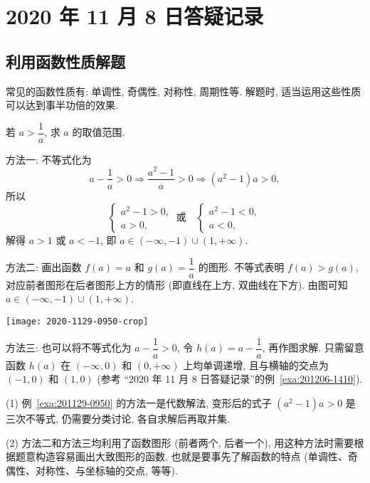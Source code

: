 \section{2020 年 11 月 8 日答疑记录}

\subsection{利用函数性质解题}

常见的函数性质有: 单调性, 奇偶性, 对称性, 周期性等. 解题时, 适当运用这些性质可以达到事半功倍的效果.

\begin{example}\label{exa:201129-0950}
    若 $a>\dfrac1a$, 求 $a$ 的取值范围.
\end{example}
\begin{solution}
    方法一: 不等式化为 
    \[a-\frac1a>0\Rightarrow \frac{a^2-1}a>0\Rightarrow (a^2-1)a>0,\]
    所以
    \[\left\{\!\!\begin{array}{l}
        a^2-1>0,\\
        a>0,
        \end{array}\right.\ \text{或}\quad
      \left\{\!\!\begin{array}{l}
        a^2-1<0,\\
        a<0,
        \end{array}\right.\]
    解得 $a>1$ 或 $a<-1$, 即 $a\in(-\infty,-1)\cup(1,+\infty)$.
    
    方法二: 画出函数 $f(a)=a$ 和 $g(a)=\dfrac1a$ 的图形. 不等式表明 $f(a)>g(a)$, 对应前者图形在后者图形上方的情形 (即直线在上方, 双曲线在下方). 由图可知 $a\in(-\infty,-1)\cup(1,+\infty)$.

    \begin{center}
        \texttt{[image: 2020-1129-0950-crop]}
    \end{center}
    
    方法三: 也可以将不等式化为 $a-\dfrac1a>0$, 令 $h(a)= a-\dfrac1a$, 再作图求解. 只需留意函数 $h(a)$ 在 $(-\infty,0)$ 和 $(0,+\infty)$ 上均单调递增, 且与横轴的交点为 $(-1,0)$ 和 $(1,0)$ (参考 ``2020 年 11 月 8 日答疑记录''的例~\ref{exa:201206-1410}).
\end{solution}

\begin{remark}
    (1) 例~\ref{exa:201129-0950} 的方法一是代数解法, 变形后的式子 $(a^2-1)a>0$ 是三次不等式, 仍需要分类讨论, 各自求解后再取并集.
    
    (2) 方法二和方法三均利用了函数图形 (前者两个, 后者一个), 用这种方法时需要根据题意构造容易画出大致图形的函数, 也就是要事先了解函数的特点 (单调性、奇偶性、对称性、与坐标轴的交点, 等等).
\end{remark}


